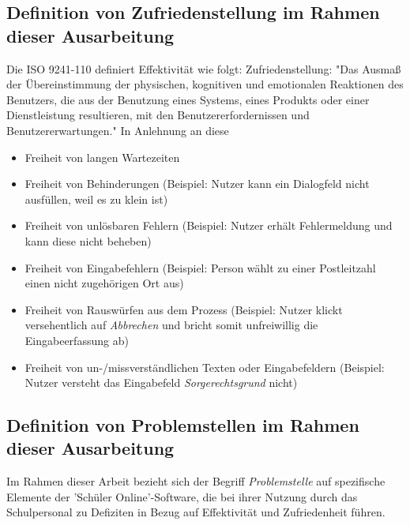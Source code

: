\subsection{Definition von Zufriedenstellung im Rahmen dieser Ausarbeitung}
Die ISO 9241-110 definiert Effektivität wie folgt: Zufriedenstellung: "Das Ausmaß der Übereinstimmung der physischen, kognitiven und emotionalen Reaktionen des Benutzers, die aus der Benutzung eines Systems, eines Produkts oder einer Dienstleistung resultieren, mit den Benutzererfordernissen und Benutzererwartungen."\cite{ISO-9241-110} In Anlehnung an diese
\begin{itemize}
    \item Freiheit von langen Wartezeiten
    \item Freiheit von Behinderungen (Beispiel: Nutzer kann ein Dialogfeld nicht ausfüllen, weil es zu klein ist)
    \item Freiheit von unlösbaren Fehlern (Beispiel: Nutzer erhält Fehlermeldung und kann diese nicht beheben)
    \item Freiheit von Eingabefehlern (Beispiel: Person wählt zu einer Postleitzahl einen nicht zugehörigen Ort aus)
    \item Freiheit von Rauswürfen aus dem Prozess (Beispiel: Nutzer klickt versehentlich auf \textit{Abbrechen} und bricht somit unfreiwillig die Eingabeerfassung ab)
    \item Freiheit von un-/missverständlichen Texten oder Eingabefeldern (Beispiel: Nutzer versteht das Eingabefeld \textit{Sorgerechtsgrund} nicht)
\end{itemize}

\subsection{Definition von Problemstellen im Rahmen dieser Ausarbeitung }
Im Rahmen dieser Arbeit bezieht sich der Begriff \textit{Problemstelle} auf spezifische Elemente der 'Schüler Online'-Software, die bei ihrer Nutzung durch das Schulpersonal zu Defiziten in Bezug auf Effektivität und Zufriedenheit führen.

